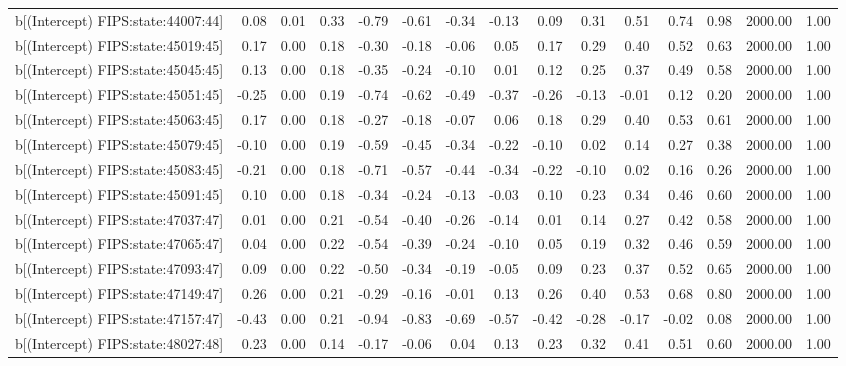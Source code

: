 \begin{table}[ht]
\begin{tabular}{rrrrrrrrrrrrrrr}
  b[(Intercept) FIPS:state:44007:44] & 0.08 & 0.01 & 0.33 & -0.79 & -0.61 & -0.34 & -0.13 & 0.09 & 0.31 & 0.51 & 0.74 & 0.98 & 2000.00 & 1.00 \\ 
  b[(Intercept) FIPS:state:45019:45] & 0.17 & 0.00 & 0.18 & -0.30 & -0.18 & -0.06 & 0.05 & 0.17 & 0.29 & 0.40 & 0.52 & 0.63 & 2000.00 & 1.00 \\ 
  b[(Intercept) FIPS:state:45045:45] & 0.13 & 0.00 & 0.18 & -0.35 & -0.24 & -0.10 & 0.01 & 0.12 & 0.25 & 0.37 & 0.49 & 0.58 & 2000.00 & 1.00 \\ 
  b[(Intercept) FIPS:state:45051:45] & -0.25 & 0.00 & 0.19 & -0.74 & -0.62 & -0.49 & -0.37 & -0.26 & -0.13 & -0.01 & 0.12 & 0.20 & 2000.00 & 1.00 \\ 
  b[(Intercept) FIPS:state:45063:45] & 0.17 & 0.00 & 0.18 & -0.27 & -0.18 & -0.07 & 0.06 & 0.18 & 0.29 & 0.40 & 0.53 & 0.61 & 2000.00 & 1.00 \\ 
  b[(Intercept) FIPS:state:45079:45] & -0.10 & 0.00 & 0.19 & -0.59 & -0.45 & -0.34 & -0.22 & -0.10 & 0.02 & 0.14 & 0.27 & 0.38 & 2000.00 & 1.00 \\ 
  b[(Intercept) FIPS:state:45083:45] & -0.21 & 0.00 & 0.18 & -0.71 & -0.57 & -0.44 & -0.34 & -0.22 & -0.10 & 0.02 & 0.16 & 0.26 & 2000.00 & 1.00 \\ 
  b[(Intercept) FIPS:state:45091:45] & 0.10 & 0.00 & 0.18 & -0.34 & -0.24 & -0.13 & -0.03 & 0.10 & 0.23 & 0.34 & 0.46 & 0.60 & 2000.00 & 1.00 \\ 
  b[(Intercept) FIPS:state:47037:47] & 0.01 & 0.00 & 0.21 & -0.54 & -0.40 & -0.26 & -0.14 & 0.01 & 0.14 & 0.27 & 0.42 & 0.58 & 2000.00 & 1.00 \\ 
  b[(Intercept) FIPS:state:47065:47] & 0.04 & 0.00 & 0.22 & -0.54 & -0.39 & -0.24 & -0.10 & 0.05 & 0.19 & 0.32 & 0.46 & 0.59 & 2000.00 & 1.00 \\ 
  b[(Intercept) FIPS:state:47093:47] & 0.09 & 0.00 & 0.22 & -0.50 & -0.34 & -0.19 & -0.05 & 0.09 & 0.23 & 0.37 & 0.52 & 0.65 & 2000.00 & 1.00 \\ 
  b[(Intercept) FIPS:state:47149:47] & 0.26 & 0.00 & 0.21 & -0.29 & -0.16 & -0.01 & 0.13 & 0.26 & 0.40 & 0.53 & 0.68 & 0.80 & 2000.00 & 1.00 \\ 
  b[(Intercept) FIPS:state:47157:47] & -0.43 & 0.00 & 0.21 & -0.94 & -0.83 & -0.69 & -0.57 & -0.42 & -0.28 & -0.17 & -0.02 & 0.08 & 2000.00 & 1.00 \\ 
  b[(Intercept) FIPS:state:48027:48] & 0.23 & 0.00 & 0.14 & -0.17 & -0.06 & 0.04 & 0.13 & 0.23 & 0.32 & 0.41 & 0.51 & 0.60 & 2000.00 & 1.00 \\ 

\end{tabular}
\end{table}

